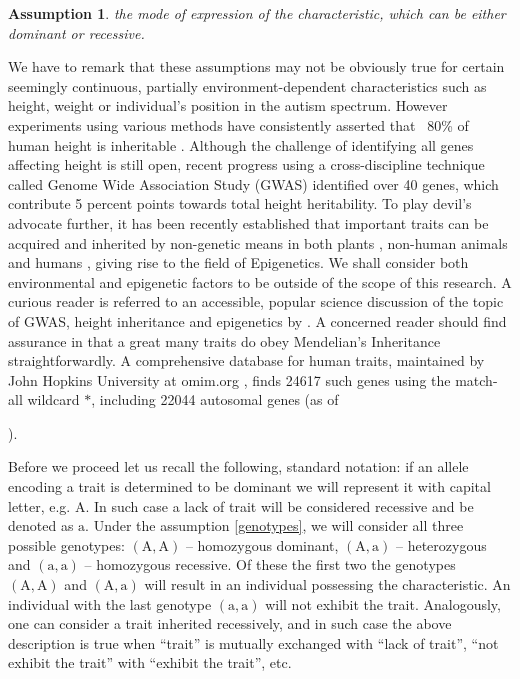 \documentclass{l4proj}
\newtheorem{assum}{Assumption}
\newcommand{\genotype}[2]{\ensuremath{(\mathrm{#1}, \mathrm{#2})}}
\begin{document}
\begin{assum}\label{dominance}
  the mode of expression of the characteristic, which can be either \gls{dominant} or \gls{recessive}.
\end{assum}

We have to remark that these assumptions may not be obviously true for certain seemingly continuous, partially environment-dependent characteristics such as height, weight or individual's position in the autism spectrum. However experiments using various methods have consistently asserted that ~80\% of human height is inheritable \parencite{heightTwins, heightJustSiblings}. Although the challenge of identifying all genes affecting height is still open, recent progress using a cross-discipline technique called Genome Wide Association Study (GWAS) identified over 40 genes, which contribute 5 percent points towards total height heritability. To play devil's advocate further, it has been recently established that important traits can be acquired and inherited by non-genetic means in both plants \parencite{palmOilKernel}, non-human animals \parencite{dolinoy_maternal_2007} and humans \parencite{yehuda_holocaust_2015}, giving rise to the field of Epigenetics. We shall consider both environmental and epigenetic factors to be outside of the scope of this research. A curious reader is referred to an accessible, popular science discussion of the topic of GWAS, height inheritance and epigenetics by \textcite{GWASDiscussion}. A concerned reader should find assurance in that a great many traits do obey Mendelian's Inheritance straightforwardly. A comprehensive database for human traits, maintained by John Hopkins University at omim.org \parencite{omim16}, finds 24617 such genes using the match-all wildcard $*$, including 22044 \gls{autosomal} genes (as of \date{March 13, 2016}).

Before we proceed let us recall the following, standard notation: if an \gls{allele} encoding a trait is determined to be \gls{dominant} we will represent it with capital letter, e.g. $\mathrm{A}$. In such case a lack of trait will be considered \gls{recessive} and be denoted as $\mathrm{a}$. Under the assumption \ref{genotypes}, we will consider all three possible genotypes: \genotype{A}{A} -- homozygous dominant, \genotype{A}{a} -- heterozygous and \genotype{a}{a} -- homozygous recessive. Of these the first two the genotypes \genotype{A}{A} and \genotype{A}{a} will result in an individual possessing the characteristic. An individual with the last genotype \genotype{a}{a} will not exhibit the trait. Analogously, one can consider a trait inherited recessively, and in such case the above description is true when ``trait'' is mutually exchanged with ``lack of trait'', ``not exhibit the trait'' with ``exhibit the trait'', etc.
\end{document}

